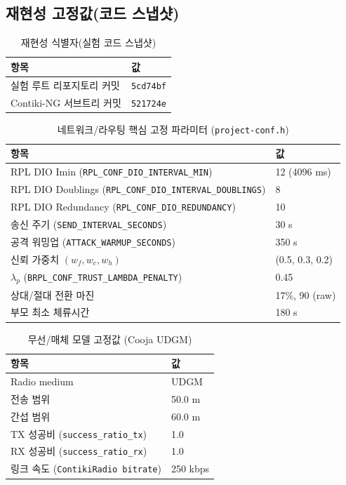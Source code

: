 \documentclass[12pt,a4paper]{article}
\begin{document}
\subsection{재현성 고정값(코드 스냅샷)}
\label{app:repro_lock}

\begin{table}[htbp]
\centering
\caption{재현성 식별자(실험 코드 스냅샷)}
\label{tab:repro_hash}
\begin{tabular}{ll}
\toprule
항목 & 값 \\
\midrule
실험 루트 리포지토리 커밋 & \texttt{5cd74bf} \\
Contiki-NG 서브트리 커밋 & \texttt{521724e} \\
\bottomrule
\end{tabular}
\end{table}

\begin{table}[htbp]
\centering
\caption{네트워크/라우팅 핵심 고정 파라미터 (\texttt{project-conf.h})}
\label{tab:repro_params}
\begin{tabular}{ll}
\toprule
항목 & 값 \\
\midrule
RPL DIO Imin (\texttt{RPL\_CONF\_DIO\_INTERVAL\_MIN}) & 12 (4096 ms) \\
RPL DIO Doublings (\texttt{RPL\_CONF\_DIO\_INTERVAL\_DOUBLINGS}) & 8 \\
RPL DIO Redundancy (\texttt{RPL\_CONF\_DIO\_REDUNDANCY}) & 10 \\
송신 주기 (\texttt{SEND\_INTERVAL\_SECONDS}) & 30 s \\
공격 워밍업 (\texttt{ATTACK\_WARMUP\_SECONDS}) & 350 s \\
신뢰 가중치 $(w_f,w_c,w_h)$ & (0.5, 0.3, 0.2) \\
$\lambda_p$ (\texttt{BRPL\_CONF\_TRUST\_LAMBDA\_PENALTY}) & 0.45 \\
상대/절대 전환 마진 & 17\%, 90 (raw) \\
부모 최소 체류시간 & 180 s \\
\bottomrule
\end{tabular}
\end{table}

\begin{table}[htbp]
\centering
\caption{무선/매체 모델 고정값 (Cooja UDGM)}
\label{tab:repro_udgm}
\begin{tabular}{ll}
\toprule
항목 & 값 \\
\midrule
Radio medium & UDGM \\
전송 범위 & 50.0 m \\
간섭 범위 & 60.0 m \\
TX 성공비 (\texttt{success\_ratio\_tx}) & 1.0 \\
RX 성공비 (\texttt{success\_ratio\_rx}) & 1.0 \\
링크 속도 (\texttt{ContikiRadio bitrate}) & 250 kbps \\
\bottomrule
\end{tabular}
\end{table}
\end{document}
